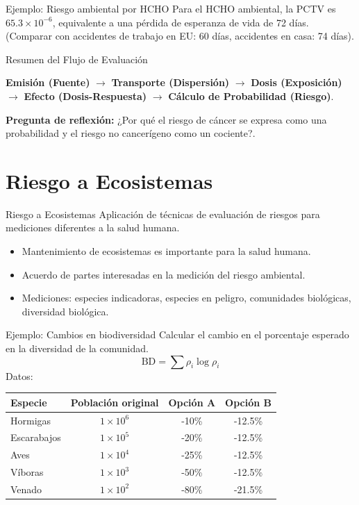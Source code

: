 \documentclass[10pt,compress]{beamer}
\begin{document}
\begin{frame}{Ejemplo: Riesgo ambiental por HCHO}
Para el HCHO ambiental, la PCTV es \(65.3\times10^{-6}\), equivalente a una pérdida de esperanza de vida de 72 días. (Comparar con accidentes de trabajo en EU: 60 días, accidentes en casa: 74 días).
\end{frame}
\begin{frame}{Resumen del Flujo de Evaluación}
    \begin{center}
        \textbf{Emisión (Fuente)} $\rightarrow$ \textbf{Transporte (Dispersión)} $\rightarrow$ \textbf{Dosis (Exposición)} $\rightarrow$ \textbf{Efecto (Dosis-Respuesta)} $\rightarrow$ \textbf{Cálculo de Probabilidad (Riesgo)}.
    \end{center}
    \vspace{1em}
    \textbf{Pregunta de reflexión:} ¿Por qué el riesgo de cáncer se expresa como una probabilidad y el riesgo no cancerígeno como un cociente?.
\end{frame}
\section{Riesgo a Ecosistemas}
\begin{frame}{Riesgo a Ecosistemas}
Aplicación de técnicas de evaluación de riesgos para mediciones diferentes a la salud humana.
\begin{itemize}
\item Mantenimiento de ecosistemas es importante para la salud humana.
\item Acuerdo de partes interesadas en la medición del riesgo ambiental.
\item Mediciones: especies indicadoras, especies en peligro, comunidades biológicas, diversidad biológica.
\end{itemize}
\end{frame}

\begin{frame}{Ejemplo: Cambios en biodiversidad}
Calcular el cambio en el porcentaje esperado en la diversidad de la comunidad.
\[
\text{BD} = \sum \rho_i \log \rho_i
\]
Datos:
\begin{table}
\centering
\begin{tabular}{lccc}
\toprule
\textbf{Especie} & Población original & Opción A & Opción B \\
\midrule
Hormigas & \(1\times10^6\) & -10\% & -12.5\% \\
Escarabajos & \(1\times10^5\) & -20\% & -12.5\% \\
Aves & \(1\times10^4\) & -25\% & -12.5\% \\
Víboras & \(1\times10^3\) & -50\% & -12.5\% \\
Venado & \(1\times10^2\) & -80\% & -21.5\% \\
\bottomrule
\end{tabular}
\end{table}
\end{frame}
\end{document}
